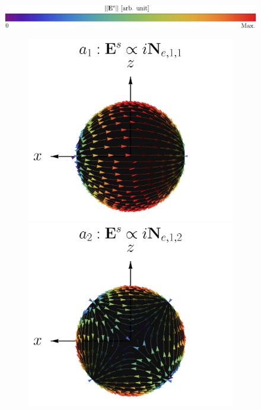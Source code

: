 \documentclass[letterpaper,11pt] {article}
\begin{document}
	\begin{figure}[h]\centering
		\includegraphics[scale=.85]{1-Teoria/figs/EsNorm.pdf}\\
		\hspace{-4em}
		\begin{subfigure}{.05\linewidth}\vspace{-3.25cm}\label{figs:ElectricMultipoles} \caption{ } \end{subfigure}
		\hspace{-3em}
		\begin{subfigure}{.9\linewidth}
			\includegraphics[scale=.25]{1-Teoria/figs/Ne11_static_crop.png}%
			\includegraphics[scale=.25]{1-Teoria/figs/Ne12_static_crop.png}%

\end{subfigure}
\end{figure}
\end{document}
